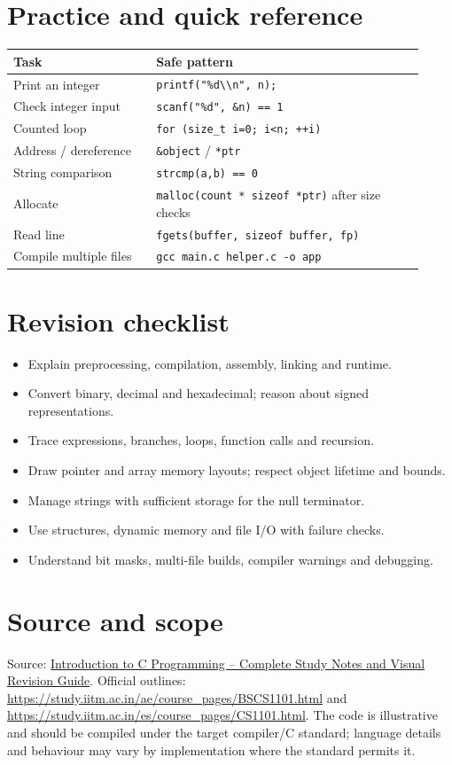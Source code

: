\documentclass[11pt,a4paper]{article}
\begin{document}
\section{Practice and quick reference}
\begin{longtable}{p{0.32\linewidth}p{0.6\linewidth}}\toprule
Task & Safe pattern \\ \midrule
Print an integer & \lstinline|printf("%d\\n", n);| \\
Check integer input & \lstinline|scanf("%d", &n) == 1| \\
Counted loop & \texttt{for (size\_t i=0; i<n; ++i)} \\
Address / dereference & \texttt{\&object} / \texttt{*ptr} \\
String comparison & \texttt{strcmp(a,b) == 0} \\
Allocate & \texttt{malloc(count * sizeof *ptr)} after size checks \\
Read line & \texttt{fgets(buffer, sizeof buffer, fp)} \\
Compile multiple files & \texttt{gcc main.c helper.c -o app} \\
\bottomrule\end{longtable}
\section{Revision checklist}
\begin{itemize}
\item Explain preprocessing, compilation, assembly, linking and runtime.
\item Convert binary, decimal and hexadecimal; reason about signed representations.
\item Trace expressions, branches, loops, function calls and recursion.
\item Draw pointer and array memory layouts; respect object lifetime and bounds.
\item Manage strings with sufficient storage for the null terminator.
\item Use structures, dynamic memory and file I/O with failure checks.
\item Understand bit masks, multi-file builds, compiler warnings and debugging.
\end{itemize}
\section{Source and scope}
Source: \href{https://app.notion.com/p/403a8fc810f681228557d063ea987071}{Introduction to C Programming -- Complete Study Notes and Visual Revision Guide}. Official outlines: \url{https://study.iitm.ac.in/ae/course_pages/BSCS1101.html} and \url{https://study.iitm.ac.in/es/course_pages/CS1101.html}. The code is illustrative and should be compiled under the target compiler/C standard; language details and behaviour may vary by implementation where the standard permits it.
\end{document}
